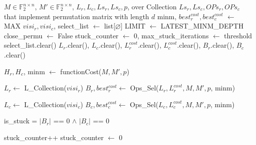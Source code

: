 \begin{algorithm}[htbp]
\caption{Row-or-Col Greedy}
\label{alg:row-or-col-greedy}
\scriptsize
\begin{algorithmic}[1]
\Require $M \in \mathbb{F}_{2}^{n \times n}$, $M' \in \mathbb{F}_{2}^{n \times n}$, $L_{r}, L_{c}, Ls_{r}, Ls_{c}, p$, over
\Ensure Collection $Ls_{r}, Ls_{c}, OPs_{r}, OPs_{c}$ that implement permutation matrix with length $d$
\State minm, $best_{r}^{cost}, best_{c}^{cost}$ $\leftarrow$ MAX 
\State $visi_{r}, visi_{c}$, select\_list $\leftarrow$ list[$\varnothing$] 
\State LIMIT $\leftarrow$ LATEST\_MINM\_DEPTH 
\State close\_permu $\leftarrow$ False
\State stuck\_counter $\leftarrow$ 0, max\_stuck\_iterations $\leftarrow$ threshold 
	\State select\_list.clear()
	\State $L_{r}$.clear(), $L_{c}$.clear(), $L_{r}^{cost}$.clear(), $L_{c}^{cost}$.clear(), $B_{r}$.clear(), $B_{c}$.clear() 
	
	\State $H_{r}, H_{c}$, minm $\leftarrow$ functionCost($M, M', p$) 
    
	\State $L_{r} \leftarrow$ L\_Collection($visi_{r}$) 
	\State $B_{r}, best_{r}^{cost} \leftarrow$ Ops\_Sel($L_{r}, L_{r}^{cost}, M, M', p$, minm) 
	
	\State $L_{c} \leftarrow$ L\_Collection($visi_{c}$) 
	\State $B_{c}, best_{c}^{cost} \leftarrow$ Ops\_Sel($L_{c}, L_{c}^{cost}, M, M', p$, minm) 
	
	\State is\_stuck = $|B_{r}|$ == 0 $\land$ $|B_{c}|$ == 0 
	
		\State stuck\_counter++ 
	\Else
		\State stuck\_counter $\leftarrow$ 0 
    \EndIf
    

\end{algorithmic}
\end{algorithm}

